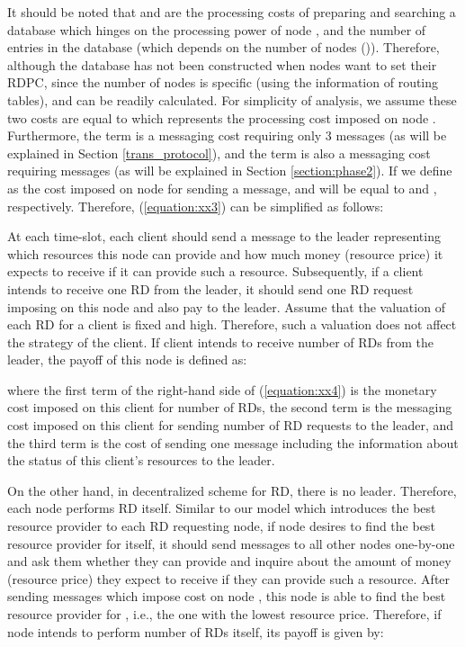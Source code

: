 \documentclass[journal,12pt, onecolumn]{IEEEtran}
\begin{document}
It should be noted that  and  are the processing costs of preparing and searching a database which hinges on the processing power of node , and the number of entries in the database (which depends on the number of nodes ()). Therefore, although the database has not been constructed when nodes want to set their RDPC, since the number of nodes is specific (using the information of routing tables),  and  can be readily calculated.
For simplicity of analysis, we assume these two costs are equal to  which represents the processing cost imposed on node . Furthermore, the term  is a messaging cost requiring only 3 messages (as will be explained in Section \ref{trans_protocol}), and the term  is also a messaging cost requiring  messages (as will be explained in Section \ref{section:phase2}). If we define  as the cost imposed on node  for sending a message,  and  will be equal to  and , respectively. Therefore, (\ref{equation:xx3}) can be simplified as follows:
 

At each time-slot, each client should send a message to the leader representing which resources this node can provide and how much money (resource price) it expects to receive if it can provide such a resource. Subsequently, if a client intends to receive one RD from the leader, it should send one RD request imposing  on this node and also pay  to the leader. Assume that the valuation of each RD for a client is fixed and high. Therefore, such a valuation does not affect the strategy of the client. If client  intends to receive  number of RDs from the leader, the payoff of this node is defined as:

where the first term of the right-hand side of (\ref{equation:xx4}) is the monetary cost imposed on this client for  number of RDs, the second term is the messaging cost imposed on this client for sending  number of RD requests to the leader, and the third term is the cost of sending one message including the information about the status of this client's resources to the leader.

On the other hand, in decentralized scheme for RD, there is no leader. Therefore, each node performs RD itself. Similar to our model which introduces the best resource provider to each RD requesting node, if node  desires to find the best resource provider for  itself, it should send messages to all other  nodes one-by-one and ask them whether they can provide  and inquire about the amount of money (resource price) they expect to receive if they can provide such a resource. After sending  messages which impose  cost on node , this node is able to find the best resource provider for , i.e., the one with the lowest resource price. Therefore, if node  intends to perform  number of RDs itself, its payoff is given by: 
\end{document}
